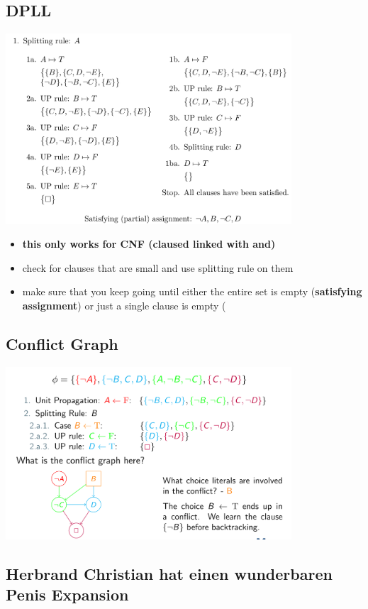 \documentclass[conference]{styles/acmsiggraph}
\begin{document}
\subsection{DPLL}

\includegraphics[width=0.8\textwidth]{imgs/dpll.png}

\begin{itemize}
    \item \textbf{this only works for CNF (claused linked with and)}
    \item check for clauses that are small and use splitting rule on them
    \item make sure that you keep going until either the entire set is empty (\textbf{satisfying assignment}) or just a single clause is empty (
\end{itemize}

\subsection{Conflict Graph}

\includegraphics[width=0.8\textwidth]{imgs/conflict.png}

\subsection{Herbrand Christian hat einen wunderbaren Penis Expansion}
\end{document}
